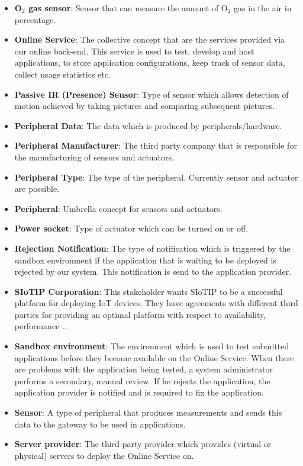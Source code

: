 \begin{itemize}
	\item \textbf{O$_2$ gas sensor}: Sensor that can measure the amount of O$_2$ gas in the air  in percentage.
	\item \textbf{Online Service}: The collective concept that are the services provided via our online back-end. This service is used to test, develop and host applications, to store application configurations, keep track of sensor data, collect usage statistics etc. 
	\item \textbf{Passive IR (Presence) Sensor}: Type of sensor which allows detection of motion achieved by taking pictures and comparing subsequent pictures.
	\item \textbf{Peripheral Data}: The data which is produced by peripherals/hardware.
	\item \textbf{Peripheral Manufacturer}: The third party company that is responsible for the manufacturing of sensors and actuators.
	\item \textbf{Peripheral Type}: The type of the peripheral. Currently sensor and actuator are possible.
	\item \textbf{Peripheral}: Umbrella concept for sensors and actuators.
	\item \textbf{Power socket}: Type of actuator which can be turned on or off.
	\item \textbf{Rejection Notification}: The type of notification which is triggered by the sandbox environment if the application that is waiting to be deployed is rejected by our system. This notification is send to the application provider.
	\item \textbf{SIoTIP Corporation}: This stakeholder wants SIoTIP to be a successful platform for deploying IoT devices. They have agreements with different third parties for providing an optimal platform with respect to availability, performance ..
	\item \textbf{Sandbox environment}: The environment which is used to test submitted applications before they become available on the Online Service. When there are problems with the application being tested, a system administrator performs a secondary, manual review. If he rejects the application, the application provider is notified and is required to fix the application.
	\item \textbf{Sensor}: A type of peripheral that produces measurements and sends this data to the gateway to be used in applications.
	\item \textbf{Server provider}: The third-party provider which provides (virtual or physical) servers to deploy the Online Service on.

\end{itemize}
